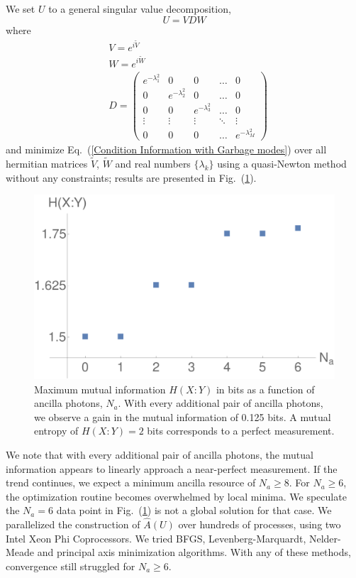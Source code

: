 \documentclass[aps,pra,twocolumn,showpacs,superscriptaddress,floatfix,10pt]{revtex4}
\begin{document}
We set $U$ to a general singular value decomposition,
\begin{equation}
	\label{Singular Value Decomposition}
	U = V D W
\end{equation}
where
\begin{eqnarray}
	& V = e^{i \tilde{V}} \\
	& W = e^{i \tilde{W}} \\
	& D =  \begin{pmatrix} e^{-\lambda^2_1} & 0 & 0 & \hdots & 0 \\ 0 & e^{-\lambda^2_2} & 0 & \hdots & 0 \\ 0 & 0 & e^{-\lambda^2_3} & \hdots & 0 \\ \vdots
	& \vdots & \vdots & \ddots & \vdots \\
	0 & 0 & 0 & \hdots & e^{-\lambda^2_M} \end{pmatrix} 
\end{eqnarray}
and minimize Eq.~(\ref{Condition Information with Garbage modes}) over all hermitian matrices $\tilde{V}$, $\tilde{W}$ and real numbers $\{\lambda_k\}$ using a quasi-Newton method without any constraints; results are presented in Fig.~(\ref{Mutual Information Results}).
\begin{figure}[ht]
	\centering
	\includegraphics[width= 0.48 \textwidth]{./EntropyData.pdf}
	\caption{ Maximum mutual information $H(X:Y)$ in bits as a function of ancilla photons, $N_a$. With every additional pair of ancilla photons, we observe a gain in the mutual information of 0.125 bits. A mutual entropy of $H(X:Y) = 2$ bits corresponds to a perfect measurement.}
	\label{Mutual Information Results}
\end{figure}
We note that with every additional pair of ancilla photons, the mutual information appears to linearly approach a near-perfect measurement. If the trend continues, we expect a minimum ancilla resource of $N_a \ge 8$. For $N_a \ge 6$, the optimization routine becomes overwhelmed by local minima. We speculate the $N_a=6$ data point in Fig.~(\ref{Mutual Information Results}) is not a global solution for that case. We parallelized the construction of $\hat{A}(U)$ over hundreds of processes, using two Intel Xeon Phi Coprocessors. We tried BFGS, Levenberg-Marquardt, Nelder-Meade and principal axis minimization algorithms. With any of these methods, convergence still struggled for $N_a \ge 6$.
\end{document}
